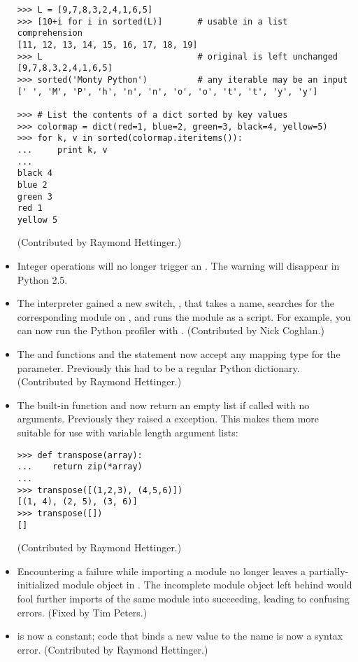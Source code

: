 \documentclass{howto}
\begin{document}
\begin{itemize}
\begin{verbatim}
>>> L = [9,7,8,3,2,4,1,6,5]
>>> [10+i for i in sorted(L)]       # usable in a list comprehension
[11, 12, 13, 14, 15, 16, 17, 18, 19]
>>> L                               # original is left unchanged
[9,7,8,3,2,4,1,6,5]
>>> sorted('Monty Python')          # any iterable may be an input
[' ', 'M', 'P', 'h', 'n', 'n', 'o', 'o', 't', 't', 'y', 'y']

>>> # List the contents of a dict sorted by key values
>>> colormap = dict(red=1, blue=2, green=3, black=4, yellow=5)
>>> for k, v in sorted(colormap.iteritems()):
...     print k, v
...
black 4
blue 2
green 3
red 1
yellow 5
\end{verbatim}

(Contributed by Raymond Hettinger.)

\item Integer operations will no longer trigger an .
The  warning will disappear in Python 2.5.

\item The interpreter gained a new switch, , that
takes a name, searches for the corresponding  module on ,
and runs the module as a script.  For example, 
you can now run the Python profiler with .
(Contributed by Nick Coghlan.)

\item The 
and 
functions and the  statement now accept any mapping type
for the  parameter.  Previously this had to be a regular
Python dictionary.  (Contributed by Raymond Hettinger.)

\item The  built-in function and 
  now return an empty list if called with no arguments.
  Previously they raised a 
  exception.  This makes them more
  suitable for use with variable length argument lists:

\begin{verbatim}
>>> def transpose(array):
...    return zip(*array)
...
>>> transpose([(1,2,3), (4,5,6)])
[(1, 4), (2, 5), (3, 6)]
>>> transpose([])
[]
\end{verbatim}
(Contributed by Raymond Hettinger.)
    
\item Encountering a failure while importing a module no longer leaves
a partially-initialized module object in .  The
incomplete module object left behind would fool further imports of the
same module into succeeding, leading to confusing errors.  
(Fixed by Tim Peters.)

\item {} is now a constant; code that binds a new value to 
the name  is now a syntax error.
(Contributed by Raymond Hettinger.)       

\end{itemize}
\end{document}
